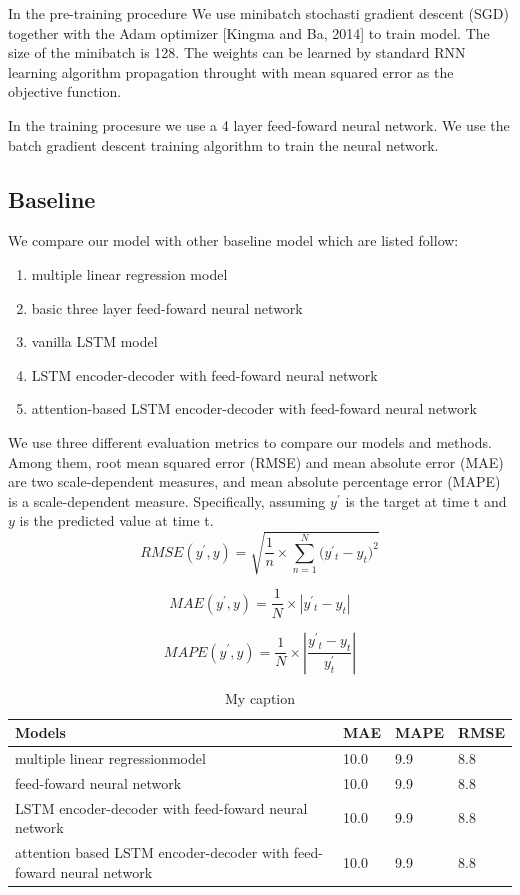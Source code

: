 \documentclass[5p]{elsarticle}
\begin{document}
In the pre-training procedure We use minibatch stochasti gradient descent (SGD) together with the Adam optimizer [Kingma and Ba, 2014] to train model. The size of the minibatch is 128. The weights can be learned by standard RNN learning algorithm propagation throught with mean squared error as the objective function.

In the training procesure we use a 4 layer feed-foward neural network. We use the batch gradient descent training algorithm to train the neural network.

\subsection{Baseline}
We compare our model with other baseline model which are listed follow:
\begin{enumerate}
  \item multiple linear regression model
  \item basic three layer feed-foward neural network
  \item vanilla LSTM model
  \item LSTM encoder-decoder with feed-foward neural network
  \item attention-based LSTM encoder-decoder with feed-foward neural network
\end{enumerate}

We use three different evaluation metrics to compare our models and methods. Among them, root mean squared error (RMSE) and mean absolute error (MAE) are two scale-dependent measures, and mean absolute percentage error (MAPE) is a scale-dependent measure. Specifically, assuming $y^'$ is the target at time t and $y$ is the predicted value at time t. 
\begin{equation}
    RMSE(y^{'},y)=\sqrt{\frac{1}{n}\times{\sum_{n=1}^N(y^{'}{_t}-y_t})^2}
\end{equation}

\begin{equation}
	 MAE(y^{'},y)=\frac{1}{N}\times\left| y^{'}{_t}-y_t \right|
\end{equation}

\begin{equation}
	 MAPE(y^{'},y)=\frac{1}{N}\times\left| \frac{y^{'}{_t}-y_t}{y^'_t} \right|
\end{equation}

\begin{table}[]
\centering
\caption{My caption}
\label{my-label}
\begin{tabular}{|l|l|l|l|}
\hline
Models & MAE & MAPE & RMSE\\
\hline
multiple linear regressionmodel & 10.0 & 9.9  & 8.8 \\
\hline
feed-foward neural network & 10.0 & 9.9  & 8.8 \\
\hline
LSTM encoder-decoder with feed-foward neural network& 10.0 & 9.9  & 8.8 \\
\hline
attention based LSTM encoder-decoder with feed-foward neural network & 10.0 & 9.9  & 8.8\\    
\hline 
\end{tabular}
\end{table}
\end{document}
